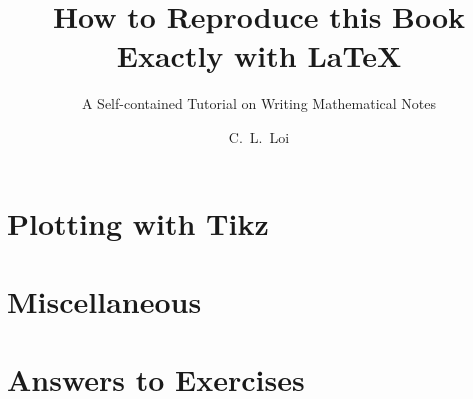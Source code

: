 \documentclass{scrbook}
\title{How to Reproduce this Book Exactly with \LaTeX}
\subtitle{A Self-contained Tutorial on Writing Mathematical Notes}
\author{C.~L.~Loi}
\begin{document}
\frontmatter


\mainmatter








\chapter{Plotting with Tikz}
\chapter{Miscellaneous}

\backmatter
\cleardoubleoddpage
\chapter*{Answers to Exercises}
\shipoutAnswer
\end{document}
